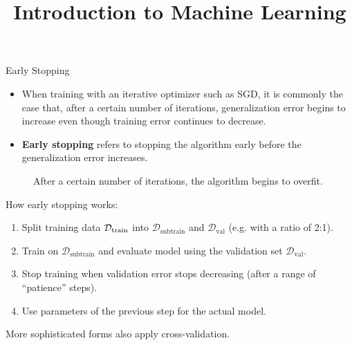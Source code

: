 \documentclass[11pt,compress,t,notes=noshow, xcolor=table]{beamer}
\title{Introduction to Machine Learning}
\begin{document}




\begin{vbframe}{Early Stopping}
  
  \begin{itemize}
    \item When training with an iterative optimizer such as SGD, it is commonly the case that, after a certain number of iterations, generalization error begins to increase even though training error continues to decrease.     
    \item \textbf{Early stopping} refers to stopping the algorithm early before the generalization error increases.
  \end{itemize}
  \begin{figure}
    \centering
      \caption{After a certain number of iterations, the algorithm begins to overfit.}
  \end{figure}
\framebreak
  How early stopping works:
  \begin{enumerate}
    \item Split training data $\mathcal{D}_{\text{train}}$ into $\mathcal{D}_{\text{subtrain}}$ and $\mathcal{D}_{\text{val}}$ (e.g. with a ratio of 2:1).
    \item Train on $\mathcal{D}_{\text{subtrain}}$ and evaluate model using the validation set $\mathcal{D}_{\text{val}}$.
    \item Stop training when validation error stops decreasing (after a range of \enquote{patience} steps).
    \item Use parameters of the previous step for the actual model.
  \end{enumerate}
  More sophisticated forms also apply cross-validation.
\end{vbframe}
\end{document}
